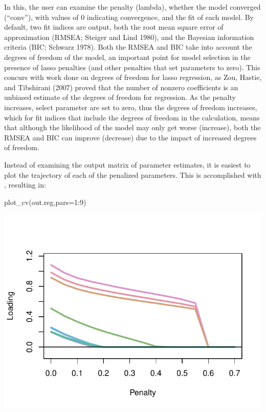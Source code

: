 \documentclass[article]{jss}
\begin{document}
In this, the user can examine the penalty (lambda), whether the model
converged (``conv''), with values of 0 indicating convergence, and the
fit of each model. By default, two fit indices are output, both the root
mean square error of approximation (RMSEA; Steiger and Lind 1980), and
the Bayesian information criteria (BIC; Schwarz 1978). Both the RMSEA
and BIC take into account the degrees of freedom of the model, an
important point for model selection in the presence of lasso penalties
(and other penalties that set parameters to zero). This concurs with
work done on degrees of freedom for lasso regression, as Zou, Hastie,
and Tibshirani (2007) proved that the number of nonzero coefficients is
an unbiased estimate of the degrees of freedom for regression. As the
penalty increases, select parameter are set to zero, thus the degrees of
freedom increases, which for fit indices that include the degrees of
freedom in the calculation, means that although the likelihood of the
model may only get worse (increase), both the RMSEA and BIC can improve
(decrease) due to the impact of increased degrees of freedom.

Instead of examining the  output matrix of parameter
estimates, it is easiest to plot the trajectory of each of the penalized
parameters. This is accomplished with ,
resulting in:

\begin{CodeChunk}
\begin{CodeInput}
plot_cv(out.reg,pars=1:9)
\end{CodeInput}


\begin{center}\includegraphics{draft1_files/figure-latex/unnamed-chunk-5-1} \end{center}

\end{CodeChunk}
\end{document}
